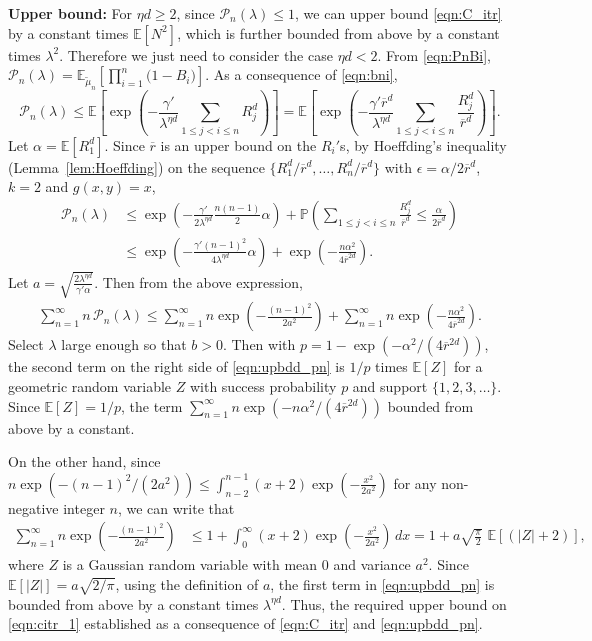 \documentclass[11pt]{article}
\newcommand{\pp}{\mathbb{P}}
\newcommand{\ee}{\mathbb{E}}
\newcommand{\rbdd}{\overline{r}}
\newcommand{\mbb}{\mathbb}
\newcommand{\lt}{\left}
\newcommand{\rt}{\right}
\newcommand{\wt}{\widetilde}
\newcommand{\pnon}{\mathcal{P}_n(\lambda)}
\begin{document}
\begin{appendices}
\noindent
{\bf Upper bound:} For $\eta d \geq 2$, since $\pnon \leq 1$, we can upper bound \eqref{eqn:C_itr} by a constant times $\ee[N^{2}]$, which is further bounded from  above by a constant times $\lambda^2$.
Therefore we just need to consider the case $\eta d < 2$. 
From \eqref{eqn:PnBi}, ${\pnon = {\mbb E}_{\wt \mu_n}\left[\prod_{i=1}^{n}\Big(1 - B_{i}\Big)\right]}$. As a consequence of \eqref{eqn:bni},
$$\displaystyle\pnon \leq \ee\lt[\exp\lt(- \frac{\gamma'}{\lambda^{\eta d}} \sum_{1 \leq j < i \leq n} R_j^d \rt)  \rt] = \ee\lt[\exp\lt(- \frac{\gamma' \rbdd^d}{\lambda^{\eta d}} \sum_{1 \leq j < i \leq n} \frac{R_j^d}{\rbdd^d} \rt)  \rt].$$
Let $\alpha = \ee[R_1^d]$. Since $\rbdd$ is an upper bound on the $R_i'$s,  by Hoeffding's inequality (Lemma~\ref{lem:Hoeffding}) on the sequence $\{R^d_1/\rbdd^d, \dots, R^d_n/\rbdd^d\}$ with $\epsilon = \alpha/2\rbdd^d$, $k = 2$ and $g(x,y) = x$,
\begin{align*}
 \pnon &\leq \exp\lt( - \frac{\gamma'}{ 2\lambda^{\eta d}} \frac{n(n-1)}{2} \alpha\rt)  + \pp\lt( \sum_{1 \leq j < i \leq n} \frac{R_j^d}{\rbdd^d}  \leq  \frac{\alpha}{2\rbdd^d} \rt) \\
     &\leq \exp\lt( - \frac{\gamma' (n-1)^2}{ 4\lambda^{\eta d}}  \alpha\rt)  + \exp\lt(-\frac{n\alpha^2}{4\rbdd^{2d}} \rt).
\end{align*}
Let $a = \sqrt{\frac{2\lambda^{\eta d}}{\gamma' \alpha}}$.   Then from the above expression,
\begin{align}
\label{eqn:upbdd_pn}
 \sum_{n=1}^\infty n\, \pnon \leq  \sum_{n = 1}^\infty n \exp\lt( -\frac{(n-1)^2}{2 a^2} \rt) + \sum_{n=1}^\infty n\exp\lt(- \frac{n\alpha^2}{4\rbdd^{2d}}\rt).
\end{align}
Select $\lambda$ large enough so that $b > 0$. Then with $p = 1 - \exp(-\alpha^2/(4\rbdd^{2d}))$, the second term on the right side of \eqref{eqn:upbdd_pn} is $1/p$ times $\ee\lt[Z\rt]$ for a geometric random variable $Z$ with success probability $p$ and support $\{1,2,3,\dots\}$. Since $\ee\lt[Z\rt] = 1/p$, the term $\sum_{n=1}^\infty n\exp\lt(- n \alpha^2/(4\rbdd^{2d})\rt)$ bounded from above by a constant.

On the other hand, since $n \exp\lt( - (n-1)^2/(2 a^2) \rt) \leq \int_{n - 2}^{n - 1} (x+2) \exp\lt( - \frac{x^2}{2 a^2} \rt)$ for any non-negative integer $n$, we can write that
\begin{align*}
 \sum_{n = 1}^\infty  n \exp\lt( -\frac{(n-1)^2}{2 a^2} \rt) &\leq 1 + \int_{0}^\infty (x+2) \exp\lt( -\frac{x^2}{2 a^2} \rt) \, dx = 1 + a\sqrt{\frac{\pi}{2}}\,\, \ee\lt[\lt(\big|Z\big| +2\rt)\rt],
\end{align*}
where $Z$ is a Gaussian random variable with mean $0$ and variance $a^2$. 
{Since $\ee[|Z|] = a \sqrt{2/\pi}$}, using the definition of $a$, the first term in \eqref{eqn:upbdd_pn} is bounded from above by a constant times $\lambda^{\eta d}$.
Thus, the required upper bound on \eqref{eqn:citr_1} established as a consequence of \eqref{eqn:C_itr} and \eqref{eqn:upbdd_pn}.\\


\end{appendices}
\end{document}
